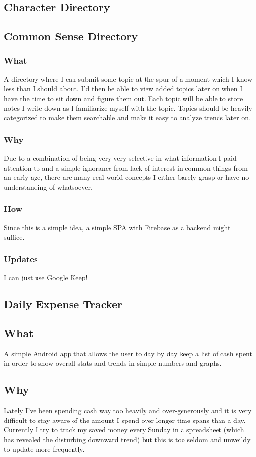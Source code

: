 \documentclass{article}[2017/07/09]
\begin{document}
  \subsection{Character Directory}

  \subsection{Common Sense Directory}
    \subsubsection{What}
      A directory where I can submit some topic at the spur of a moment which I know less than I should about. I'd then be able to view added topics later on when I have the time to sit down and figure them out.
      Each topic will be able to store notes I write down as I familiarize myself with the topic. Topics should be heavily categorized to make them searchable and make it easy to analyze trends later on.
    \subsubsection{Why}
      Due to a combination of being very very selective in what information I paid attention to and a simple ignorance from lack of interest in common things
      from an early age, there are many real-world concepts I either barely grasp or have no understanding of whatsoever.
    \subsubsection{How}
      Since this is a simple idea, a simple SPA with Firebase as a backend might suffice.
    \subsubsection{Updates}
      I can just use Google Keep!
      
  \subsection{Daily Expense Tracker}
    \subsection{What}
      A simple Android app that allows the user to day by day keep a list of cash spent in order to show overall stats and trends in simple numbers and graphs.
    \subsection{Why}
      Lately I've been spending cash way too heavily and over-generously and it is very difficult to stay aware of the amount I spend over longer time spans than a day. Currently I try to track my saved money every Sunday in a spreadsheet (which has revealed the disturbing downward trend) but this is too seldom and unweildy to update more frequently.
\end{document}
